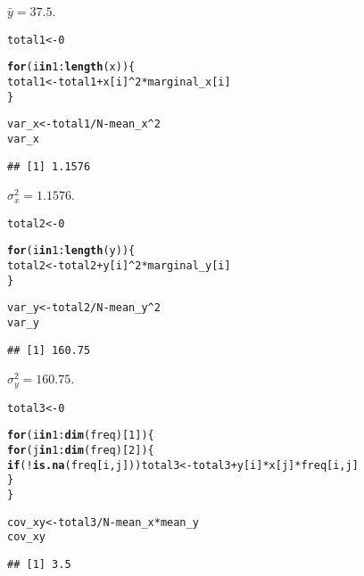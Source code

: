 \documentclass[11pt, a4paper]{article}\usepackage[]{graphicx}\usepackage[]{xcolor}
\makeatletter
\newcommand{\hlnum}[1]{\textcolor[rgb]{0.686,0.059,0.569}{#1}}%
\newcommand{\hlopt}[1]{\textcolor[rgb]{0,0,0}{#1}}%
\newcommand{\hldef}[1]{\textcolor[rgb]{0.345,0.345,0.345}{#1}}%
\newcommand{\hlkwa}[1]{\textcolor[rgb]{0.161,0.373,0.58}{\textbf{#1}}}%
\newcommand{\hlkwb}[1]{\textcolor[rgb]{0.69,0.353,0.396}{#1}}%
\newcommand{\hlkwd}[1]{\textcolor[rgb]{0.737,0.353,0.396}{\textbf{#1}}}%
\newenvironment{kframe}{%
 \def\at@end@of@kframe{}%
 \ifinner\ifhmode%
  \def\at@end@of@kframe{\end{minipage}}%
  \begin{minipage}{\columnwidth}%
 \fi\fi%
 \def\FrameCommand##1{\hskip\@totalleftmargin \hskip-\fboxsep
 \colorbox{shadecolor}{##1}\hskip-\fboxsep
     \hskip-\linewidth \hskip-\@totalleftmargin \hskip\columnwidth}%
 \MakeFramed {\advance\hsize-\width
   \@totalleftmargin\z@ \linewidth\hsize
   \@setminipage}}%
 {\par\unskip\endMakeFramed%
 \at@end@of@kframe}
\newenvironment{knitrout}{}{} %
\makeatother
\begin{document}
$\bar{y} = 37.5$.

\begin{knitrout}
\color{fgcolor}\begin{kframe}
\begin{alltt}
\hldef{total1} \hlkwb{<-} \hlnum{0}

\hlkwa{for} \hldef{(i} \hlkwa{in} \hlnum{1}\hlopt{:}\hlkwd{length}\hldef{(x)) \{}
  \hldef{total1} \hlkwb{<-} \hldef{total1} \hlopt{+} \hldef{x[i]}\hlopt{^}\hlnum{2} \hlopt{*} \hldef{marginal_x[i]}
\hldef{\}}

\hldef{var_x} \hlkwb{<-} \hldef{total1} \hlopt{/} \hldef{N} \hlopt{-} \hldef{mean_x}\hlopt{^}\hlnum{2}
\hldef{var_x}
\end{alltt}
\begin{verbatim}
## [1] 1.1576
\end{verbatim}
\end{kframe}
\end{knitrout}

$\sigma_x^2 = 1.1576$.

\begin{knitrout}
\color{fgcolor}\begin{kframe}
\begin{alltt}
\hldef{total2} \hlkwb{<-} \hlnum{0}

\hlkwa{for} \hldef{(i} \hlkwa{in} \hlnum{1}\hlopt{:}\hlkwd{length}\hldef{(y)) \{}
  \hldef{total2} \hlkwb{<-} \hldef{total2} \hlopt{+} \hldef{y[i]}\hlopt{^}\hlnum{2} \hlopt{*} \hldef{marginal_y[i]}
\hldef{\}}

\hldef{var_y} \hlkwb{<-} \hldef{total2} \hlopt{/} \hldef{N} \hlopt{-} \hldef{mean_y}\hlopt{^}\hlnum{2}
\hldef{var_y}
\end{alltt}
\begin{verbatim}
## [1] 160.75
\end{verbatim}
\end{kframe}
\end{knitrout}

$\sigma_y^2 = 160.75$.

\begin{knitrout}
\color{fgcolor}\begin{kframe}
\begin{alltt}
\hldef{total3} \hlkwb{<-} \hlnum{0}

\hlkwa{for} \hldef{(i} \hlkwa{in} \hlnum{1}\hlopt{:}\hlkwd{dim}\hldef{(freq)[}\hlnum{1}\hldef{]) \{}
  \hlkwa{for} \hldef{(j} \hlkwa{in} \hlnum{1}\hlopt{:}\hlkwd{dim}\hldef{(freq)[}\hlnum{2}\hldef{]) \{}
    \hlkwa{if}\hldef{(}\hlopt{!}\hlkwd{is.na}\hldef{(freq[i, j])) total3} \hlkwb{<-} \hldef{total3} \hlopt{+} \hldef{y[i]} \hlopt{*} \hldef{x[j]} \hlopt{*} \hldef{freq[i, j]}
  \hldef{\}}
\hldef{\}}

\hldef{cov_xy} \hlkwb{<-} \hldef{total3} \hlopt{/} \hldef{N} \hlopt{-} \hldef{mean_x} \hlopt{*} \hldef{mean_y}
\hldef{cov_xy}
\end{alltt}
\begin{verbatim}
## [1] 3.5
\end{verbatim}
\end{kframe}
\end{knitrout}
\end{document}
